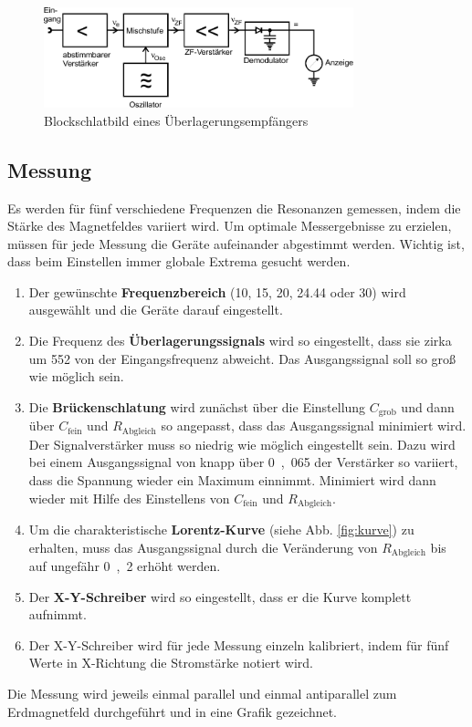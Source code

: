 \begin{figure}[h!]
	\centering
	\includegraphics[width=0.8\textwidth]{Anleitung_Abb9.pdf}
	\caption[Blockschlatbild eines Überlagerungsempfängers]{Blockschlatbild eines Überlagerungsempfängers \cite{V28}}
	\label{fig:verstaerker}
\end{figure}




\clearpage

\subsection{Messung}
Es werden für fünf verschiedene Frequenzen die Resonanzen gemessen, indem die Stärke des Magnetfeldes variiert wird. Um optimale Messergebnisse zu erzielen, müssen für jede Messung die Geräte aufeinander abgestimmt werden. Wichtig ist, dass beim Einstellen immer globale Extrema gesucht werden.

\begin{enumerate}
	
\item{Der gewünschte \textbf{Frequenzbereich} (10, 15, 20, 24.44 oder \si{30}{\mega\hertz}) wird ausgewählt und die Geräte darauf eingestellt.}

\item{Die Frequenz des \textbf{Überlagerungssignals} wird so eingestellt, dass sie zirka um \si{552}{\kilo\hertz} von der Eingangsfrequenz abweicht. Das Ausgangssignal soll so groß wie möglich sein.}

\item{Die \textbf{Brückenschlatung} wird zunächst über die Einstellung $C_\textrm{grob}$ und dann über $C_\textrm{fein}$ und $R_\textrm{Abgleich}$ so angepasst, dass das Ausgangssignal minimiert wird. Der Signalverstärker muss so niedrig wie möglich eingestellt sein. Dazu wird bei einem  Ausgangssignal von knapp über \si{0,065}{\volt} der Verstärker so variiert, dass die Spannung wieder ein Maximum einnimmt. Minimiert wird dann wieder mit Hilfe des Einstellens von $C_\textrm{fein}$ und $R_{\textrm{Abgleich}}$.}

\item{Um die charakteristische \textbf{Lorentz-Kurve} (siehe Abb. \ref{fig:kurve}) zu erhalten, muss das Ausgangssignal durch die Veränderung von $R_\textrm{Abgleich}$ bis auf ungefähr  \si{0,2}{\volt} erhöht werden.}

\item{Der \textbf{X-Y-Schreiber} wird so eingestellt, dass er die Kurve komplett aufnimmt.}
\item{Der X-Y-Schreiber wird für jede Messung einzeln kalibriert, indem für fünf Werte in X-Richtung die Stromstärke notiert wird.\label{Schritt6}}
\end{enumerate}
Die Messung wird jeweils einmal parallel und einmal antiparallel zum Erdmagnetfeld durchgeführt und in eine Grafik gezeichnet.

